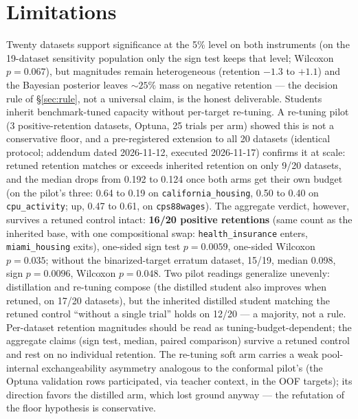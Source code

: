 \documentclass[11pt]{article}
\begin{document}
\section{Limitations}
\label{sec:limitations}

Twenty datasets support significance at the 5\% level on both
instruments (on the 19-dataset sensitivity population only the sign
test keeps that level; Wilcoxon $p = 0.067$),
but magnitudes remain heterogeneous (retention $-1.3$ to $+1.1$) and the
Bayesian posterior leaves ${\sim}25\%$ mass on negative retention --- the
decision rule of \S\ref{sec:rule}, not a universal claim, is the honest
deliverable. Students inherit benchmark-tuned capacity without per-target
re-tuning. A re-tuning pilot (3 positive-retention datasets, Optuna, 25
trials per arm) showed this is not a conservative floor, and a
pre-registered extension to all 20 datasets (identical protocol;
addendum dated 2026-11-12, executed 2026-11-17) confirms it at scale:
retuned retention matches or exceeds inherited retention on only 9/20
datasets, and the median drops from 0.192 to 0.124 once both arms get
their own budget (on the pilot's three: 0.64 to 0.19 on
\texttt{california\_\allowbreak housing}, 0.50 to 0.40 on
\texttt{cpu\_activity}; up, 0.47 to 0.61, on \texttt{cps88wages}). The
aggregate verdict, however, survives a retuned control intact:
\textbf{16/20 positive retentions} (same count as the inherited base,
with one compositional swap: \texttt{health\_\allowbreak insurance} enters,
\texttt{miami\_\allowbreak housing} exits), one-sided sign test $p{=}0.0059$,
one-sided Wilcoxon $p{=}0.035$; without the binarized-target erratum
dataset, 15/19, median 0.098, sign $p{=}0.0096$, Wilcoxon $p{=}0.048$.
Two pilot readings generalize unevenly: distillation and re-tuning
compose (the distilled student also improves when retuned, on 17/20
datasets), but the inherited distilled student matching the retuned
control ``without a single trial'' holds on 12/20 --- a majority, not a
rule. Per-dataset retention magnitudes should be read as
tuning-budget-dependent; the aggregate claims (sign test, median,
paired comparison) survive a retuned control and rest on no individual
retention.
The re-tuning soft arm carries a weak pool-internal
exchangeability asymmetry analogous to the conformal pilot's (the
Optuna validation rows participated, via teacher context, in the OOF
targets); its direction favors the distilled arm, which lost ground
anyway --- the refutation of the floor hypothesis is conservative.
\end{document}
